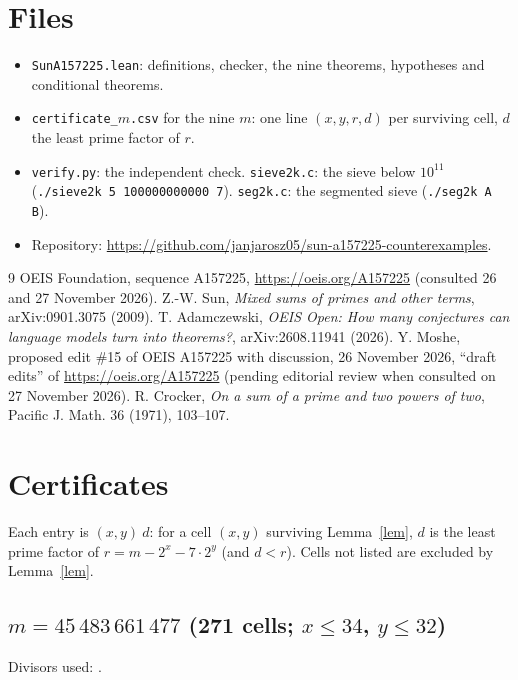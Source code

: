 \documentclass[11pt,a4paper]{article}
\theoremstyle{definition}\newtheorem{definition}[theorem]{Definition}
\theoremstyle{remark}\newtheorem{remark}[theorem]{Remark}
\begin{document}
\section{Files}
\begin{itemize}[leftmargin=1.4em,itemsep=1pt]
\item \texttt{SunA157225.lean}: definitions, checker, the nine theorems, hypotheses and conditional theorems.
\item \texttt{certificate\_}$m$\texttt{.csv} for the nine $m$: one line $(x,y,r,d)$ per surviving cell, $d$ the least prime factor of $r$.
\item \texttt{verify.py}: the independent check. \texttt{sieve2k.c}: the sieve below $10^{11}$
(\texttt{./sieve2k 5 100000000000 7}). \texttt{seg2k.c}: the segmented sieve (\texttt{./seg2k A B}).
\item Repository: \url{https://github.com/janjarosz05/sun-a157225-counterexamples}.
\end{itemize}

\begin{thebibliography}{9}
 OEIS Foundation, sequence A157225, \url{https://oeis.org/A157225} (consulted 26 and 27 November 2026).
 Z.-W. Sun, \emph{Mixed sums of primes and other terms}, arXiv:0901.3075 (2009).
 T. Adamczewski, \emph{OEIS Open: How many conjectures can language models turn into theorems?}, arXiv:2608.11941 (2026).
 Y. Moshe, proposed edit \#15 of OEIS A157225 with discussion, 26 November 2026,
``draft edits'' of \url{https://oeis.org/A157225} (pending editorial review when consulted on 27 November 2026).
 R. Crocker, \emph{On a sum of a prime and two powers of two}, Pacific J. Math. 36 (1971), 103--107.
\end{thebibliography}

\appendix
\section{Certificates}
Each entry is $(x,y)\ d$: for a cell $(x,y)$ surviving Lemma~\ref{lem}, $d$ is the least prime factor of
$r=m-2^x-7\cdot2^y$ (and $d<r$). Cells not listed are excluded by Lemma~\ref{lem}.
\small
\subsection*{$m=45\,483\,661\,477$ \quad (271 cells; $x\le 34$, $y\le 32$)}
Divisors used: .
\begin{longtable}{@{}llllll@{}}\end{longtable}
\end{document}
